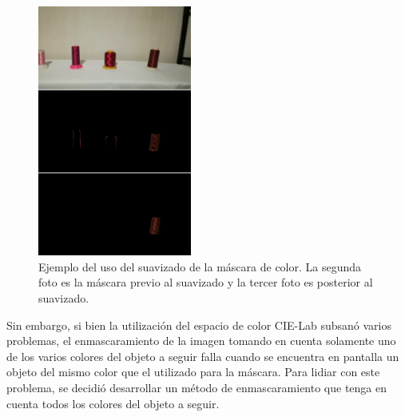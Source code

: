 \begin{figure}[H]
	\centering
	\includegraphics[width=0.45\textwidth]{Imagenes/medianblur.png}
	\caption{Ejemplo del uso del suavizado de la máscara de color. La segunda foto es la máscara previo al suavizado y la tercer foto es posterior al suavizado.}
	\label{fig:medianblur}
\end{figure}

Sin embargo, si bien la utilización del espacio de color CIE-Lab subsanó varios problemas, el enmascaramiento de la imagen tomando en cuenta solamente uno de los varios colores del objeto a seguir falla cuando se encuentra en pantalla un objeto del mismo color que el utilizado para la máscara. Para lidiar con este problema, se decidió desarrollar un método de enmascaramiento que tenga en cuenta todos los colores del objeto a seguir.





















